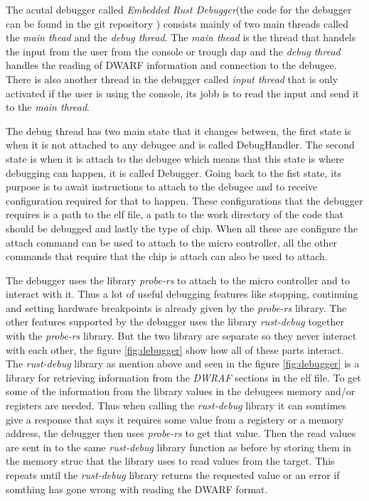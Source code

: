 The acutal debugger called \emph{Embedded Rust Debugger}(the code for the debugger can be found in the git repository \cite{erd}) consists mainly of two main threads called the \emph{main thead} and the \emph{debug thread}.
The \emph{main thead} is the thread that handels the input from the user from the console or trough \gls{dap} and the \emph{debug thread} handles the reading of \gls{DWARF} information and connection to the \gls{debugee}.
There is also another thread in the debugger called \emph{input thread} that is only activated if the user is using the console, its jobb is to read the input and send it to the \emph{main thread}.


The debug thread has two main state that it changes between, the first state is when it is not attached to any \gls{debugee} and is called DebugHandler.
The second state is when it is attach to the \gls{debugee} which means that this state is where debugging can happen, it is called Debugger.
Going back to the fist state, its purpose is to await instructions to attach to the \gls{debugee} and to receive configuration required for that to happen.
These configurations that the debugger requires is a path to the elf file, a path to the work directory of the code that should be debugged and lastly the type of chip.
When all these are configure the attach command can be used to attach to the micro controller, all the other commands that require that the chip is attach can also be used to attach.


The debugger uses the library \emph{probe-rs} \cite{probe} to attach to the micro controller and to interact with it.
Thus a lot of useful debugging features like stopping, continuing and setting hardware breakpoints is already given by the \emph{probe-rs} library.
The other features supported by the debugger uses the library \emph{rust-debug} together with the \emph{probe-rs} library.
But the two library are separate so they never interact with each other, the figure \ref{fig:debugger} show how all of these parts interact.
The \emph{rust-debug} library as mention above and seen in the figure \ref{fig:debugger} is a library for retrieving information from the \emph{DWRAF} sections in the \gls{elf} file.
To get some of the information from the library values in the \glspl{debugee} memory and/or registers are needed.
Thus when calling the \emph{rust-debug} library it can somtimes give a response that says it requires some value from a registery or a memory address, the debugger then uses \emph{probe-rs} to get that value.
Then the read values are sent in to the same \emph{rust-debug} library function as before by storing them in the memory struc that the library uses to read values from the target.
This repeats until the \emph{rust-debug} library returns the requested value or an error if somthing has gone wrong with reading the \gls{DWARF} format.


